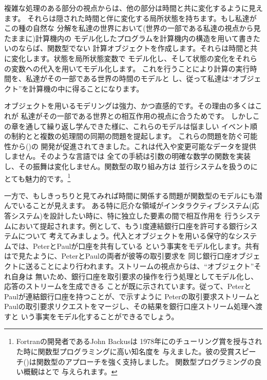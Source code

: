 複雑な処理のある部分の視点からは、他の部分は時間と共に変化するように見えます。
それらは隠された時間と伴に変化する局所状態を持ちます。もし私達がこの種の自然な
分解を私達の世界において(世界の一部である私達の視点から見たままに)計算機内の
モデル化したプログラムを計算機内の構造を用いて書きたいのならば、関数型でない
計算オブジェクトを作成します。それらは時間と共に変化します。状態を局所状態変数で
モデル化し、そして状態の変化をそれらの変数への代入を用いてモデル化します。
これを行うことにより計算の実行時間を、私達がその一部である世界の時間のモデルと
し、従って私達は``オブジェクト''を計算機の中に得ることになります。



オブジェクトを用いるモデリングは強力、かつ直感的です。その理由の多くはこれが
私達がその一部である世界との相互作用の視点に合うためです。
しかしこの章を通して繰り返し学んできた様に、これらのモデルは悩ましい
イベント順の制約とと複数の処理間の同期の問題を提起します。
これらの問題を防ぐ可能性から()の
開発が促進されてきました。これは代入や変更可能なデータを提供しません。そのような言語では
全ての手続は引数の明確な数学の関数を実装し、その振舞は変化しません。関数型の取り組み方は
並行システムを扱うのにとても魅力的です。\footnote{Fortranの開発者であるJohn Backusは
1978年にのチューリング賞を授与された時に関数型プログラミングに高い知名度を
与えました。彼の受賞スピーチ()は関数型のアプローチを強く支持しました。
関数型プログラミングの良い概観はとで
与えられます。}


一方で、もしきっちりと見てみれば時間に関係する問題が関数型のモデルにも潜んでいることが見えます。
ある特に厄介な領域がインタラクティブシステム(応答システム)を設計したい時に、特に独立した要素の間で相互作用を
行うシステムにおいて提起されます。例として、もう1度連結銀行口座を許可する銀行システムについて
考えてみましょう。代入とオブジェクトを用いる保守的なシステムでは、PeterとPaulが口座を共有している
という事実をモデル化します。共有はで見たように、PeterとPaulの両者が彼等の取引要求を
同じ銀行口座オブジェクトに送ることにより行われます。ストリームの視点からは、``オブジェクト''それ自身は
無いため、銀行口座を取引要求の操作を行う処理としてモデル化し、応答のストリームを生成できる
ことが既に示されています。従って、PeterとPaulが連結銀行口座を持つことが、で示すように
Peterの取引要求ストリームとPaulの取引要求リクエストをマージし、その結果を銀行口座ストリーム処理へ渡すと
いう事実をモデル化することができるでしょう。

